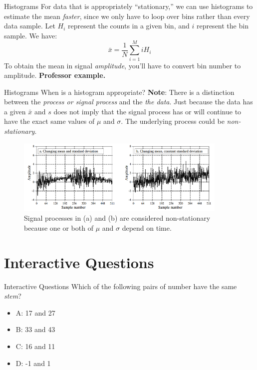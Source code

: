 \documentclass{beamer}
\begin{document}
\begin{frame}[fragile]{Histograms}
\small
For data that is appropriately ``stationary,'' we can use histograms to estimate the mean \textit{faster}, since we only have to loop over bins rather than every data sample.  Let $H_i$ represent the counts in a given bin, and $i$ represent the bin sample.  We have:
\begin{equation}
\bar{x} = \frac{1}{N}\sum_{i=1}^{M}i H_i 
\end{equation}
To obtain the mean in signal \textit{amplitude}, you'll have to convert bin number to amplitude.  \textbf{Professor example.}
\end{frame}

\begin{frame}[fragile]{Histograms}
\small
When is a histogram appropriate?
\textbf{Note}: There is a distinction between the \textit{process or signal process} and the \textit{the data}.  Just because the data has a given $\bar{x}$ and $s$ does not imply that the signal process has or will continue to have the exact same values of $\mu$ and $\sigma$.  The underlying process could be \textit{non-stationary}.
\begin{figure}
\centering
\includegraphics[width=0.9\textwidth]{figures/non_stationary.png}
\caption{\label{fig:non_stationary} Signal processes in (a) and (b) are considered \alert{non-stationary} because one or both of $\mu$ and $\sigma$ depend on time.}
\end{figure}
\end{frame}

\section{Interactive Questions}

\begin{frame}{Interactive Questions}
Which of the following pairs of number have the same \textit{stem}?
\begin{itemize}
\item A: 17 and 27
\item B: 33 and 43
\item C: 16 and 11
\item D: -1 and 1
\end{itemize}
\end{frame}
\end{document}
